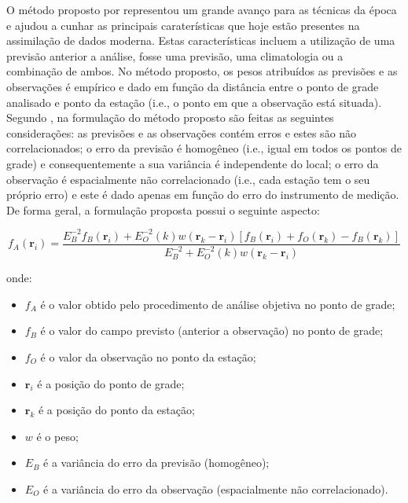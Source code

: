 O método proposto por  representou um grande avanço para as técnicas da época e ajudou a cunhar as principais caraterísticas que hoje estão presentes na assimilação de dados moderna. Estas características incluem a utilização de uma previsão anterior a análise, fosse uma previsão, uma climatologia ou a combinação de ambos. No método proposto, os pesos atribuídos as previsões e as observações é empírico e dado em função da distância entre o ponto de grade analisado e ponto da estação (i.e., o ponto em que a observação está situada). Segundo , na formulação do método proposto  são feitas as seguintes considerações: as previsões e as observações contém erros e estes são não correlacionados; o erro da previsão é homogêneo (i.e., igual em todos os pontos de grade) e consequentemente a sua variância é independente do local; o erro da observação é espacialmente não correlacionado (i.e., cada estação tem o seu próprio erro) e este é dado apenas em função do erro do instrumento de medição. De forma geral, a formulação proposta possui o seguinte aspecto:

\begin{equation}
\label{eq:bd1955}
    f_{A}(\mathbf{r}_i) = \frac{E_{B}^{-2}f_{B}(\mathbf{r}_i)+E_{O}^{-2}(k)w(\mathbf{r}_k-\mathbf{r}_i)[f_{B}(\mathbf{r}_i)+f_{O}(\mathbf{r}_k)-f_{B}(\mathbf{r}_k)]}{E_{B}^{-2}+E_{O}^{-2}(k)w(\mathbf{r}_k-\mathbf{r}_i)}
\end{equation}

onde:

\begin{itemize}
    \item $f_{A}$ é o valor obtido pelo procedimento de análise objetiva no ponto de grade;
    \item $f_{B}$ é o valor do campo previsto (anterior a observação) no ponto de grade;
    \item $f_{O}$ é o valor da observação no ponto da estação;
    \item $\mathbf{r}_i$ é a posição do ponto de grade;
    \item $\mathbf{r}_k$ é a posição do ponto da estação;
    \item $w$ é o peso;
    \item $E_{B}$ é a variância do erro da previsão (homogêneo);
    \item $E_{O}$ é a variância do erro da observação (espacialmente não correlacionado).
\end{itemize}

